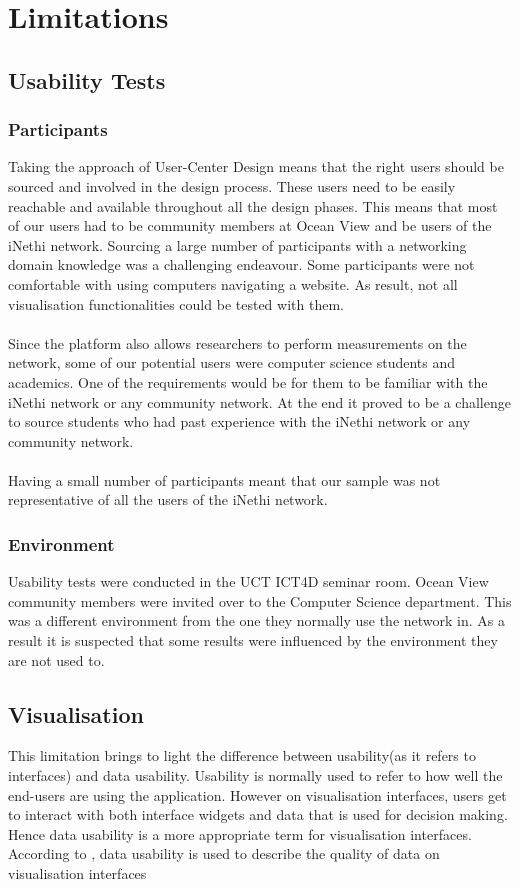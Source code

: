 \section{Limitations}
\subsection{Usability Tests}
\subsubsection{Participants}
Taking the approach of User-Center Design means that the right users should be sourced and involved in the design process. These users need to be easily reachable and available throughout all the design phases. This means that most of our users had to be community members at Ocean View and be users of the iNethi network. Sourcing a large number of participants with a networking domain knowledge was a challenging endeavour. Some participants were not comfortable with using computers navigating a website. As result, not all visualisation functionalities could be tested with them.
\paragraph{}
Since the platform also allows researchers to perform measurements on the network, some of our potential users were computer science students and academics. One of the requirements would be for them to be familiar with the iNethi network or any community network. At the end it proved to be a challenge to source students who had past experience with the iNethi network or any community network.
\paragraph{}
Having a small number of participants meant that our sample was not representative of all the users of the iNethi network.

\subsubsection{Environment}
Usability tests were conducted in the UCT ICT4D seminar room. Ocean View community members were invited over to the Computer Science department. This was a different environment from the one they normally use the network in. As a result it is suspected that some results were influenced by the environment they are not used to.
\subsection{Visualisation}
This limitation brings to light the difference between usability(as it refers to interfaces) and data usability. Usability is normally used to refer to how well the end-users are using the application\cite{Luciana}. However on visualisation interfaces, users get to interact with both interface widgets and data that is used for decision making\cite{Luciana}. Hence data usability is a more appropriate term for visualisation interfaces. According to \cite{Luciana}, data usability is used to describe the quality of data on visualisation interfaces
